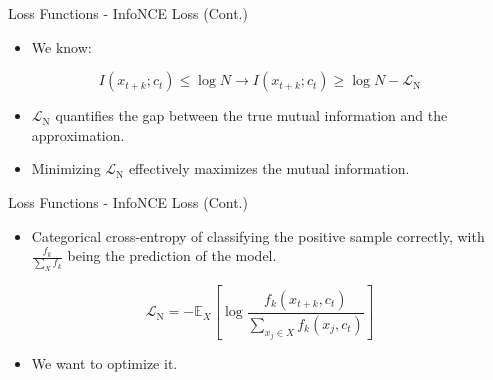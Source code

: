 \documentclass[serif, aspectratio=169]{beamer}
\begin{document}
\begin{frame}{Loss Functions - InfoNCE Loss (Cont.)}
     \begin{itemize}
         \item We know:
     \end{itemize}

     \begin{equation*}
         I(x_{t+k}; c_t) \leq \log N \xrightarrow{} I(x_{t+k}; c_t) \geq \log N - \mathcal{L}_{\mathrm{N}}
     \end{equation*}

     \begin{itemize}
         \item $\mathcal{L}_{\mathrm{N}}$ quantifies the gap between the true mutual information and the approximation.
         \item Minimizing $\mathcal{L}_{\mathrm{N}}$ effectively maximizes the mutual information.
     \end{itemize}
\end{frame}


\begin{frame}{Loss Functions - InfoNCE Loss (Cont.)}
     \begin{itemize}
         \item Categorical cross-entropy of classifying the positive sample correctly, with $\frac{f_k}{\sum_X f_k}$ being the prediction of the model.
     \end{itemize}

     \begin{equation*}
         \mathcal{L}_{\mathrm{N}}=-{\mathbb{E}_X}\left[\log \frac{f_k\left(x_{t+k}, c_t\right)}{\sum_{x_j \in X} f_k\left(x_j, c_t\right)}\right]
     \end{equation*}

     \begin{itemize}
         \item We want to optimize it.
     \end{itemize}
\end{frame}
\end{document}
